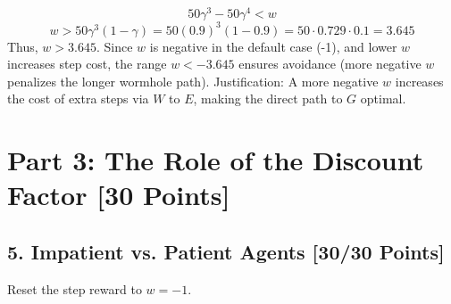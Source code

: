 \documentclass{article}
\begin{document}
\begin{itemize}
      \[
      50 \gamma^3 - 50 \gamma^4 < w
      \]
      \[
      w > 50 \gamma^3 (1 - \gamma) = 50 (0.9)^3 (1 - 0.9) = 50 \cdot 0.729 \cdot 0.1 = 3.645
      \]
      Thus, $w > 3.645$. Since $w$ is negative in the default case (-1), and lower $w$ increases step cost, the range $w < -3.645$ ensures avoidance (more negative $w$ penalizes the longer wormhole path). Justification: A more negative $w$ increases the cost of extra steps via $W$ to $E$, making the direct path to $G$ optimal.
\end{itemize}

\section*{Part 3: The Role of the Discount Factor [30 Points]}

\subsection*{5. Impatient vs. Patient Agents [30/30 Points]}

Reset the step reward to $w = -1$.
\end{document}

